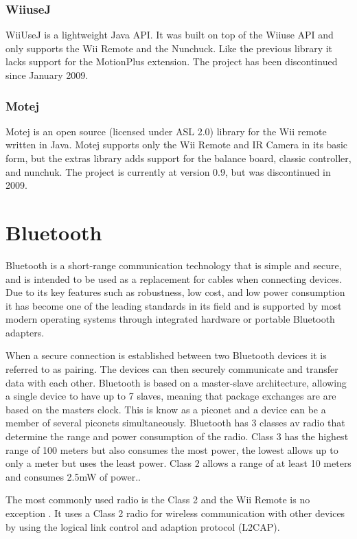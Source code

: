 \subsubsection{WiiuseJ}
WiiUseJ is a lightweight Java API. It was built on top of the Wiiuse API and only supports the Wii Remote and the Nunchuck. Like the previous library it lacks support for the MotionPlus extension. The project has been discontinued since January 2009. \cite{Wiiusej}

\subsubsection{Motej}
Motej is an open source (licensed under ASL 2.0) library for the Wii remote written in Java. Motej supports only the Wii Remote and IR Camera in its basic form, but the extras library adds support for the balance board, classic controller, and nunchuk. The project is currently at version 0.9, but was discontinued in 2009. \cite{Motej}

\section{Bluetooth}
Bluetooth is a short-range communication technology that is simple and secure, and is intended to be used as a replacement for cables when connecting devices. Due to its key features such as robustness, low cost, and low power consumption it has become one of the leading standards in its field and is supported by most modern operating systems through integrated hardware or portable Bluetooth adapters.

When a secure connection is established between two Bluetooth devices it is referred to as pairing. The devices can then securely communicate and transfer data with each other. Bluetooth is based on a master-slave architecture, allowing a single device to have up to 7 slaves, meaning that package exchanges are are based on the masters clock. This is know as a piconet and a device can be a member of several piconets simultaneously. Bluetooth has 3 classes av radio that determine the range and power consumption of the radio. Class 3 has the highest range of 100 meters but also consumes the most power, the lowest allows up to only a meter but uses the least power. Class 2 allows a range of at least 10 meters and consumes 2.5mW of power.\cite{bluetooth}.

The most commonly used radio is the Class 2 and the Wii Remote is no exception \cite{controllerSpecs}. It uses a Class 2 radio for wireless communication with other devices by using the logical link control and adaption protocol (L2CAP).